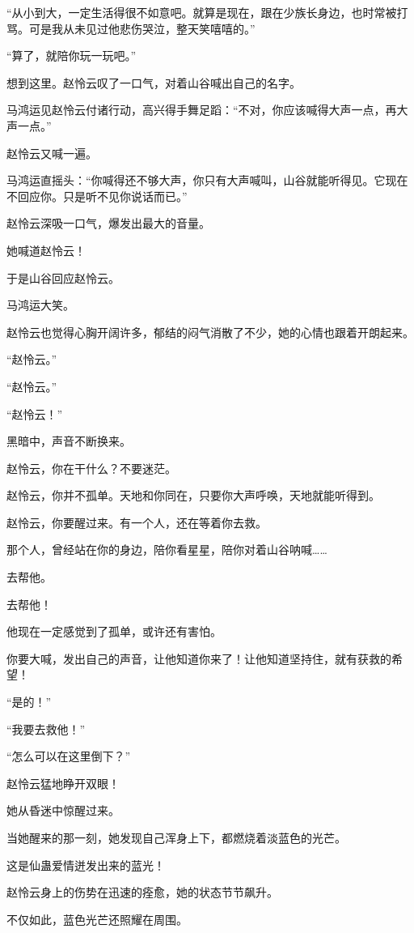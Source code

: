 \begin{this_body}
“从小到大，一定生活得很不如意吧。就算是现在，跟在少族长身边，也时常被打骂。可是我从未见过他悲伤哭泣，整天笑嘻嘻的。”

“算了，就陪你玩一玩吧。”

想到这里。赵怜云叹了一口气，对着山谷喊出自己的名字。

马鸿运见赵怜云付诸行动，高兴得手舞足蹈：“不对，你应该喊得大声一点，再大声一点。”

赵怜云又喊一遍。

马鸿运直摇头：“你喊得还不够大声，你只有大声喊叫，山谷就能听得见。它现在不回应你。只是听不见你说话而已。”

赵怜云深吸一口气，爆发出最大的音量。

她喊道赵怜云！

于是山谷回应赵怜云。

马鸿运大笑。

赵怜云也觉得心胸开阔许多，郁结的闷气消散了不少，她的心情也跟着开朗起来。

“赵怜云。”

“赵怜云。”

“赵怜云！”

黑暗中，声音不断换来。

赵怜云，你在干什么？不要迷茫。

赵怜云，你并不孤单。天地和你同在，只要你大声呼唤，天地就能听得到。

赵怜云，你要醒过来。有一个人，还在等着你去救。

那个人，曾经站在你的身边，陪你看星星，陪你对着山谷呐喊……

去帮他。

去帮他！

他现在一定感觉到了孤单，或许还有害怕。

你要大喊，发出自己的声音，让他知道你来了！让他知道坚持住，就有获救的希望！

“是的！”

“我要去救他！”

“怎么可以在这里倒下？”

赵怜云猛地睁开双眼！

她从昏迷中惊醒过来。

当她醒来的那一刻，她发现自己浑身上下，都燃烧着淡蓝色的光芒。

这是仙蛊爱情迸发出来的蓝光！

赵怜云身上的伤势在迅速的痊愈，她的状态节节飙升。

不仅如此，蓝色光芒还照耀在周围。


\end{this_body}
